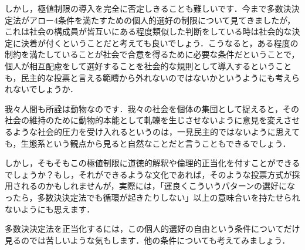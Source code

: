 しかし，極値制限の導入を完全に否定しきることも難しいです．今まで多数決決定法がアロー4条件を満たすための個人的選好の制限について見てきましたが，これは社会の構成員が皆互いにある程度類似した判断をしている時は社会的な決定に決着が付くということだと考えても良いでしょう．こうなると，ある程度の制約を満たしていることが社会で合意を得るために必要な条件だということで，個人が相互配慮をして選好することを社会的な規則として導入するということも，民主的な投票と言える範疇から外れないのではないかというようにも考えられないでしょうか．

我々人間も所詮は動物なのです．我々の社会を個体の集団として捉えると，その社会の維持のために動物的本能として軋轢を生じさせないように意見を変えさせるような社会的圧力を受け入れるというのは，一見民主的ではないように思えても，生態系という観点から見ると自然なことだと言うこともできるでしょう．

しかし，そもそもこの極値制限に道徳的解釈や倫理的正当化を付すことができるでしょうか？もし，それができるような文化であれば，そのような投票方式が採用されるのかもしれませんが，実際には，「運良くこういうパターンの選好になったら，多数決決定法でも循環が起きたりしない」以上の意味合いを持たせられないようにも思えます．

多数決決定法を正当化するには，この個人的選好の自由という条件についてだけ見るのでは苦しいような気もします．他の条件についても考えてみましょう．


